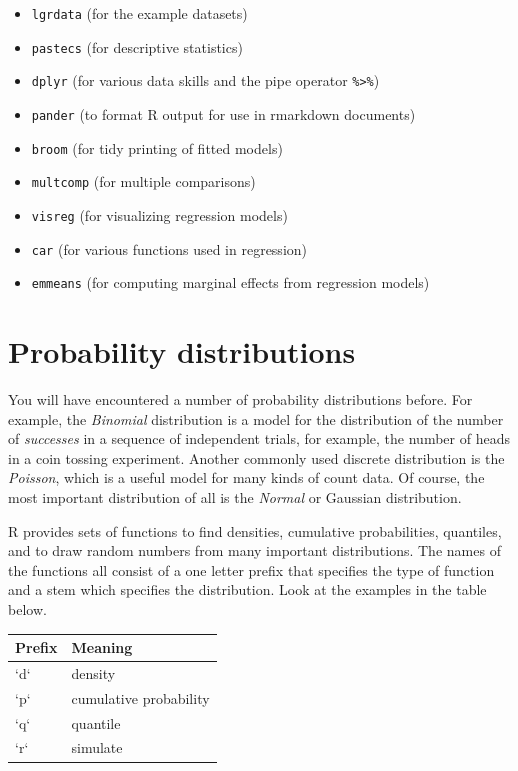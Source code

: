 \documentclass[]{book}
\providecommand{\tightlist}{%
  \setlength{\itemsep}{0pt}\setlength{\parskip}{0pt}}
\begin{document}
\begin{itemize}
\tightlist
\item
  \texttt{lgrdata} (for the example datasets)
\item
  \texttt{pastecs} (for descriptive statistics)
\item
  \texttt{dplyr} (for various data skills and the pipe operator \texttt{\%\textgreater{}\%})
\item
  \texttt{pander} (to format R output for use in rmarkdown documents)
\item
  \texttt{broom} (for tidy printing of fitted models)
\item
  \texttt{multcomp} (for multiple comparisons)
\item
  \texttt{visreg} (for visualizing regression models)
\item
  \texttt{car} (for various functions used in regression)
\item
  \texttt{emmeans} (for computing marginal effects from regression models)
\end{itemize}

\hypertarget{distributions}{%
\section{Probability distributions}\label{distributions}}

You will have encountered a number of probability distributions before. For example, the \emph{Binomial} distribution is a model for the distribution of the number of \emph{successes} in a sequence of independent trials, for example, the number of heads in a coin tossing experiment. Another commonly used discrete distribution is the \emph{Poisson}, which is a useful model for many kinds of count data. Of course, the most important distribution of all is the \emph{Normal} or Gaussian distribution.

R provides sets of functions to find densities, cumulative probabilities, quantiles, and to draw random numbers from many important distributions. The names of the functions all consist of a one letter prefix that specifies the type of function and a stem which specifies the distribution. Look at the examples in the table below.

\begin{tabular}{l|l}
\hline
Prefix & Meaning\\
\hline
`d` & density\\
\hline
`p` & cumulative probability\\
\hline
`q` & quantile\\
\hline
`r` & simulate\\
\hline
\end{tabular}
\end{document}
